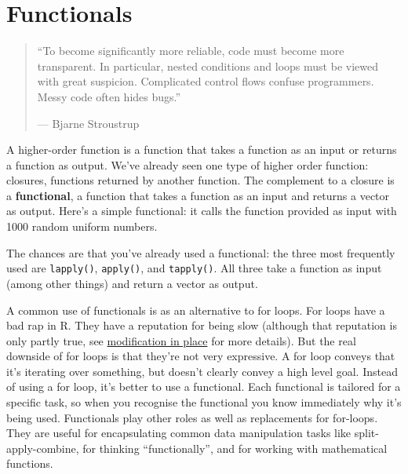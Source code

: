 \chapter{Functionals}\label{functionals}

\begin{quote}
``To become significantly more reliable, code must become more
transparent. In particular, nested conditions and loops must be viewed
with great suspicion. Complicated control flows confuse programmers.
Messy code often hides bugs.''

--- Bjarne Stroustrup
\end{quote}

A higher-order function is a function that takes a function as an input
or returns a function as output. We've already seen one type of higher
order function: closures, functions returned by another function. The
complement to a closure is a \textbf{functional}, a function that takes
a function as an input and returns a vector as output. Here's a simple
functional: it calls the function provided as input with 1000 random
uniform numbers. 

\begin{Shaded}
\begin{Highlighting}[]
\StringTok{ }\NormalTok{(}\NormalTok{(}\NormalTok{))}
\end{Highlighting}
\end{Shaded}

The chances are that you've already used a functional: the three most
frequently used are \texttt{lapply()}, \texttt{apply()}, and
\texttt{tapply()}. All three take a function as input (among other
things) and return a vector as output.

A common use of functionals is as an alternative to for loops. For loops
have a bad rap in R. They have a reputation for being slow (although
that reputation is only partly true, see
\hyperref[modification]{modification in place} for more details). But
the real downside of for loops is that they're not very expressive. A
for loop conveys that it's iterating over something, but doesn't clearly
convey a high level goal. Instead of using a for loop, it's better to
use a functional. Each functional is tailored for a specific task, so
when you recognise the functional you know immediately why it's being
used. Functionals play other roles as well as replacements for
for-loops. They are useful for encapsulating common data manipulation
tasks like split-apply-combine, for thinking ``functionally'', and for
working with mathematical functions. 

